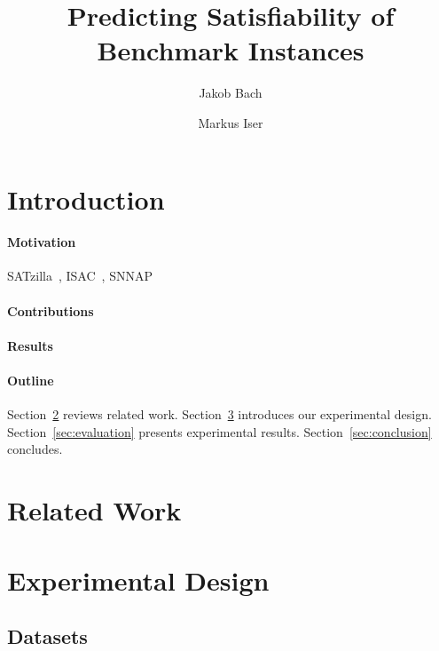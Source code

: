 \documentclass{article}
\title{Predicting Satisfiability of Benchmark Instances}
\author{Jakob Bach \and Markus Iser}
\begin{document}
\maketitle

\begin{abstract}

\end{abstract}

\section{Introduction}
\label{sec:introduction}

\paragraph{Motivation}

SATzilla~\cite{xu2008satzilla, xu2012satzilla2012}, ISAC~\cite{kadioglu2010isac}, SNNAP~\cite{collautti2013snnap}

\paragraph{Contributions}

\paragraph{Results}

\paragraph{Outline}

Section~\ref{sec:related-work} reviews related work.
Section~\ref{sec:experimental-design} introduces our experimental design.
Section~\ref{sec:evaluation} presents experimental results.
Section~\ref{sec:conclusion} concludes.

\section{Related Work}
\label{sec:related-work}

\section{Experimental Design}
\label{sec:experimental-design}

\subsection{Datasets}
\end{document}
